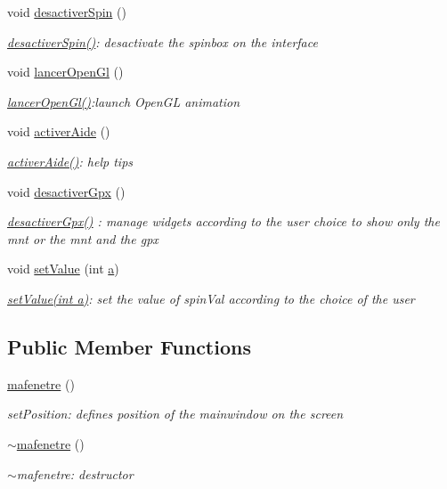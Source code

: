 \begin{DoxyCompactItemize}
void \hyperlink{classmafenetre_a0e27ded7d39843750642869a52fcce82}{desactiver\+Spin} ()
\begin{DoxyCompactList}\small\item\em \hyperlink{classmafenetre_a0e27ded7d39843750642869a52fcce82}{desactiver\+Spin()}\+: desactivate the spinbox on the interface \end{DoxyCompactList}\item 
void \hyperlink{classmafenetre_ad1d5f0f4900613ce2e026822a9456b0c}{lancer\+Open\+Gl} ()
\begin{DoxyCompactList}\small\item\em \hyperlink{classmafenetre_ad1d5f0f4900613ce2e026822a9456b0c}{lancer\+Open\+Gl()}\+:launch Open\+G\+L animation \end{DoxyCompactList}\item 
void \hyperlink{classmafenetre_a681933489d46a01d191a13e3f3e8dd34}{activer\+Aide} ()
\begin{DoxyCompactList}\small\item\em \hyperlink{classmafenetre_a681933489d46a01d191a13e3f3e8dd34}{activer\+Aide()}\+: help tips \end{DoxyCompactList}\item 
void \hyperlink{classmafenetre_a2af9b56b363ca1f30ea8c8f023a9ac91}{desactiver\+Gpx} ()
\begin{DoxyCompactList}\small\item\em \hyperlink{classmafenetre_a2af9b56b363ca1f30ea8c8f023a9ac91}{desactiver\+Gpx()} \+: manage widgets according to the user choice to show only the mnt or the mnt and the gpx \end{DoxyCompactList}\item 
void \hyperlink{classmafenetre_ac7c87be0ace6260777b0da266ffbb705}{set\+Value} (int \hyperlink{main__opengl_8cpp_aa4c2a5552e9bc49b1816ff532f558c74}{a})
\begin{DoxyCompactList}\small\item\em \hyperlink{classmafenetre_ac7c87be0ace6260777b0da266ffbb705}{set\+Value(int a)}\+: set the value of spin\+Val according to the choice of the user \end{DoxyCompactList}\end{DoxyCompactItemize}
\subsection*{Public Member Functions}
\begin{DoxyCompactItemize}
\item 
\hyperlink{classmafenetre_a6b3fd3485eac1fabe70e3b238b8e5cbc}{mafenetre} ()
\begin{DoxyCompactList}\small\item\em set\+Position\+: defines position of the mainwindow on the screen \end{DoxyCompactList}\item 
\hyperlink{classmafenetre_a4583bb1988a99e01a1b4921c0b55e47e}{$\sim$mafenetre} ()
\begin{DoxyCompactList}\small\item\em $\sim$mafenetre\+: destructor \end{DoxyCompactList}\end{DoxyCompactItemize}
